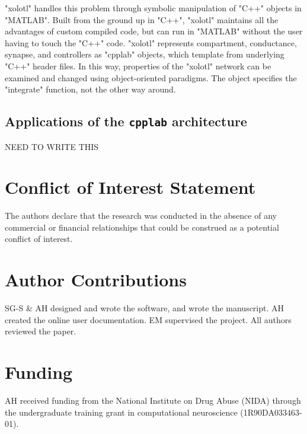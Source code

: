 \documentclass{frontiersSCNS} %
\begin{document}
"xolotl" handles this problem through symbolic manipulation of "C++" objects in "MATLAB". Built from the ground up in "C++", "xolotl" maintains all the advantages of custom compiled code, but can run in "MATLAB" without the user having to touch the "C++" code. "xolotl" represents compartment, conductance, synapse, and controllers as "cpplab" objects, which template from underlying "C++" header files. In this way, properties of the "xolotl" network can be examined and changed using object-oriented paradigms. The object specifies the "integrate" function, not the other way around.

\subsection{Applications of the \texttt{cpplab} architecture}

NEED TO WRITE THIS




%
%
%
%
%
%

\section*{Conflict of Interest Statement}

The authors declare that the research was conducted in the absence of any commercial or financial relationships that could be construed as a potential conflict of interest.

\section*{Author Contributions}

SG-S \& AH designed and wrote the software, and wrote the manuscript. AH created the online user documentation. EM supervised the project. All authors reviewed the paper.

\section*{Funding}

AH received funding from the National Institute on Drug Abuse (NIDA) through the undergraduate training grant in computational neuroscience (1R90DA033463-01).
\end{document}
